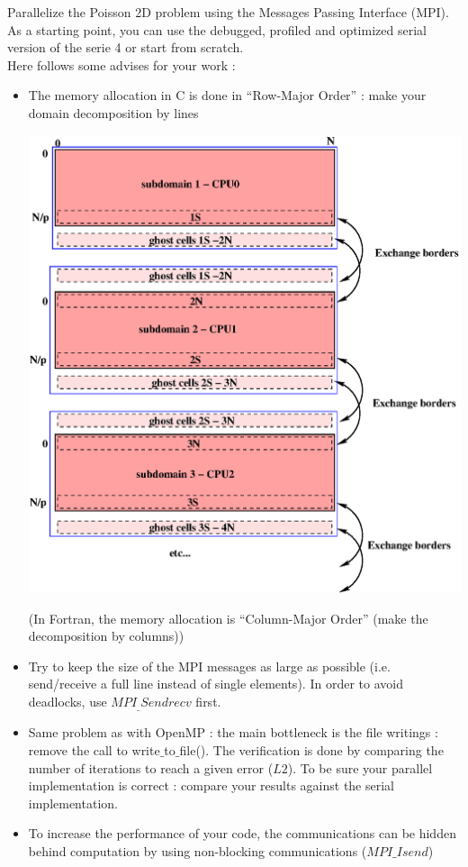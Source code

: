 \documentclass[11pt,a4paper]{article}
\begin{document}




\begin{exercise}


Parallelize the Poisson 2D problem using the Messages Passing Interface (MPI). As a starting point, you can use the debugged, profiled and optimized serial version of the serie 4 or start from scratch. 
\\

Here follows some advises for your work :

\begin{itemize}
	\item {The memory allocation in C is done in ``Row-Major Order'' : make your domain decomposition by lines
		\begin{center}
			 \includegraphics[scale=.6]{images/subdomains.eps}
		\end{center}
		(In Fortran, the memory allocation is ``Column-Major Order'' (make the decomposition by columns))
	}
	\item {Try to keep the size of the MPI messages as large as possible (i.e. send/receive a full line instead of single elements). In order to avoid deadlocks, use $MPI_\_Sendrecv$ first.}
	\item {Same problem as with OpenMP : the main bottleneck is the file writings : remove the call to write$\_$to$\_$file(). The verification is done by comparing the number of iterations to reach a given error ($L2$). To be sure your parallel implementation is correct : compare your results against the serial implementation. }
	\item {To increase the performance of your code, the communications can be hidden behind computation by using non-blocking communications ($MPI\_Isend$)}
\end{itemize}


\end{exercise}
\end{document}
